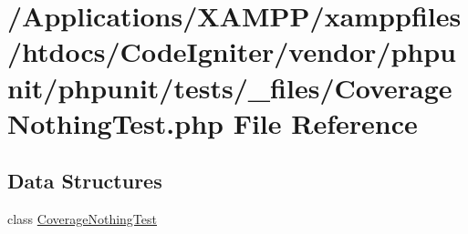 \hypertarget{phpunit_2tests_2__files_2_coverage_nothing_test_8php}{}\section{/\+Applications/\+X\+A\+M\+P\+P/xamppfiles/htdocs/\+Code\+Igniter/vendor/phpunit/phpunit/tests/\+\_\+files/\+Coverage\+Nothing\+Test.php File Reference}
\label{phpunit_2tests_2__files_2_coverage_nothing_test_8php}
\subsection*{Data Structures}
\begin{DoxyCompactItemize}
\item 
class \mbox{\hyperlink{class_coverage_nothing_test}{Coverage\+Nothing\+Test}}
\end{DoxyCompactItemize}
